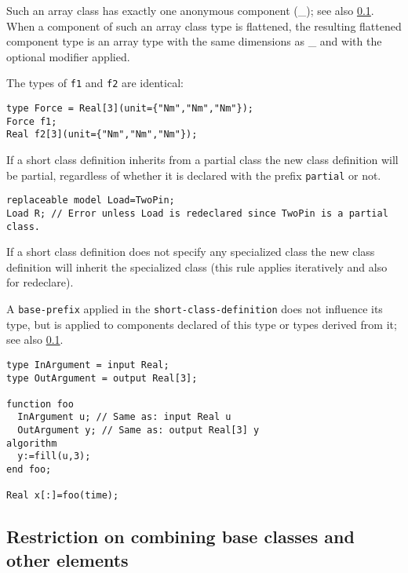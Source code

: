 Such an array class has exactly one anonymous component (\_); see also \cref{restriction-on-combining-base-classes-and-other-elements}.
When a component of such an array class type is flattened, the resulting flattened component type is an array type with the same dimensions as \_ and with the optional modifier applied.

\begin{example}
The types of \lstinline!f1! and \lstinline!f2! are identical:
\begin{lstlisting}[language=modelica]
type Force = Real[3](unit={"Nm","Nm","Nm"});
Force f1;
Real f2[3](unit={"Nm","Nm","Nm"});
\end{lstlisting}
\end{example}

If a short class definition inherits from a partial class the new class definition will be partial, regardless of whether it is declared with the prefix \lstinline!partial! or not.

\begin{example}
\begin{lstlisting}[language=modelica]
replaceable model Load=TwoPin;
Load R; // Error unless Load is redeclared since TwoPin is a partial class.
\end{lstlisting}
\end{example}

If a short class definition does not specify any specialized class the new class definition will inherit the specialized class (this rule applies iteratively and also for redeclare).

A \lstinline[language=grammar]!base-prefix! applied in the \lstinline[language=grammar]!short-class-definition! does not influence its type, but is applied to components declared of this type or types derived from it; see also \cref{restriction-on-combining-base-classes-and-other-elements}.

\begin{example}
\begin{lstlisting}[language=modelica]
type InArgument = input Real;
type OutArgument = output Real[3];

function foo
  InArgument u; // Same as: input Real u
  OutArgument y; // Same as: output Real[3] y
algorithm
  y:=fill(u,3);
end foo;

Real x[:]=foo(time);
\end{lstlisting}
\end{example}

\subsection{Restriction on combining base classes and other elements}\label{restriction-on-combining-base-classes-and-other-elements}

